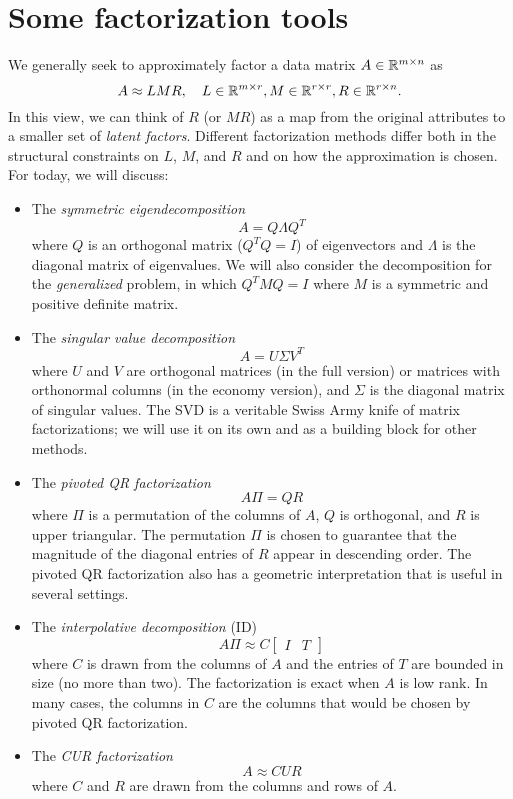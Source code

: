 \documentclass[12pt, leqno]{article} %
\begin{document}

\section{Some factorization tools}

We generally seek to approximately factor a data matrix
$A \in \mathbb{R}^{m \times n}$ as
\[
  A \approx LMR, \quad
  L \in \mathbb{R}^{m \times r},
  M \in \mathbb{R}^{r \times r},
  R \in \mathbb{R}^{r \times n}.
\]
In this view, we can think of $R$ (or $MR$) as a map from the original
attributes to a smaller set of {\em latent factors}.  Different
factorization methods differ both in the structural constraints on
$L$, $M$, and $R$ and on how the approximation is chosen.  For today,
we will discuss:
\begin{itemize}
\item
  The {\em symmetric eigendecomposition}
  \[
    A = Q \Lambda Q^T
  \]
  where $Q$ is an orthogonal matrix ($Q^T Q = I$) of eigenvectors
  and $\Lambda$ is the diagonal matrix of eigenvalues.  We will
  also consider the decomposition for the {\em generalized} problem,
  in which $Q^T M Q = I$ where $M$ is a symmetric and positive
  definite matrix.
\item
  The {\em singular value decomposition}
  \[
    A = U \Sigma V^T
  \]
  where $U$ and $V$ are orthogonal matrices (in the full version) or
  matrices with orthonormal columns (in the economy version), and
  $\Sigma$ is the diagonal matrix of singular values.  The SVD
  is a veritable Swiss Army knife of matrix factorizations; we will
  use it on its own and as a building block for other methods.
\item
  The {\em pivoted QR factorization}
  \[
    A\Pi = QR
  \]
  where $\Pi$ is a permutation of the columns of $A$, $Q$ is
  orthogonal, and $R$ is upper triangular.  The permutation $\Pi$ is
  chosen to guarantee that the magnitude of the diagonal entries of
  $R$ appear in descending order.  The pivoted QR factorization also
  has a geometric interpretation that is useful in several settings.
\item
  The {\em interpolative decomposition} (ID)
  \[
    A\Pi \approx C \begin{bmatrix} I & T \end{bmatrix}
  \]
  where $C$ is drawn from the columns of $A$ and the entries of $T$
  are bounded in size (no more than two).  The factorization is exact
  when $A$ is low rank.  In many cases, the columns in $C$ are the
  columns that would be chosen by pivoted QR factorization.
\item
  The {\em CUR factorization}
  \[
    A \approx C U R
  \]
  where $C$ and $R$ are drawn from the columns and rows of $A$.
\end{itemize}
\end{document}
